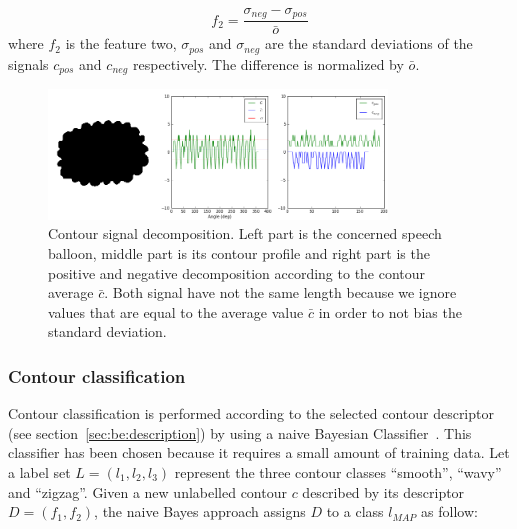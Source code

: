 \begin{equation}\label{eq:be:var_diff}
 f_2 = \frac{\sigma_{neg} - \sigma_{pos}}{\bar{o} }%
\end{equation}
where $f_2$ is the feature two, $\sigma_{pos}$ and $\sigma_{neg}$ are the standard deviations of the signals $c_{pos}$ and $c_{neg}$ respectively. The difference is normalized by $\bar{o}$.%


	\begin{figure}[!ht]	%
	  \centering
		\includegraphics[trim = 0mm 0mm 0mm 0mm, clip, width=340px]{signal_decomposition.png}
		\caption[Contour signal decomposition]{Contour signal decomposition. Left part is the concerned speech balloon, middle part is its contour profile and right part is the positive and negative decomposition according to the contour average $\bar{c}$. Both signal have not the same length because we ignore values that are equal to the average value $\bar{c}$ in order to not bias the standard deviation.}
		\label{fig:be:signal_decomposition}
	\end{figure}


\subsubsection{Contour classification}
Contour classification is performed according to the selected contour descriptor (see section~\ref{sec:be:description}) by using a naive Bayesian Classifier~\cite{Mitchell1997}.
This classifier has been chosen because it requires a small amount of training data.
Let a label set $L=(l_1,l_2,l_3)$ represent the three contour classes ``smooth'', ``wavy'' and ``zigzag''. Given a new unlabelled contour $c$ described by its descriptor $D=(f_1,f_2)$, the naive Bayes approach assigns $D$ to a class $l_{MAP}$ as follow:

